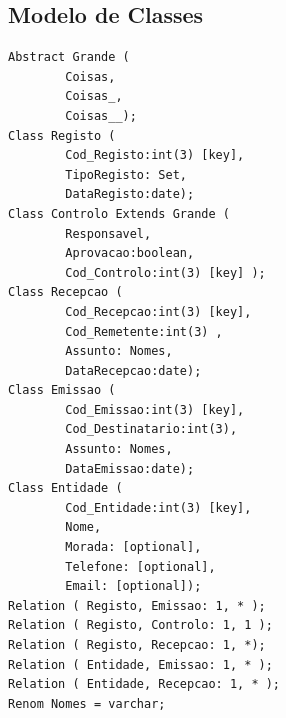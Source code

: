 \documentclass[a4paper]{article}
\begin{document}
\begin{appendix}
\section{Modelo de Classes}
\begin{small}
\begin{lstlisting}
Abstract Grande (
        Coisas,
        Coisas_,
        Coisas__);
Class Registo (
        Cod_Registo:int(3) [key],
        TipoRegisto: Set,
        DataRegisto:date);
Class Controlo Extends Grande (
        Responsavel,
        Aprovacao:boolean,
        Cod_Controlo:int(3) [key] );
Class Recepcao (
        Cod_Recepcao:int(3) [key],
        Cod_Remetente:int(3) ,
        Assunto: Nomes,
        DataRecepcao:date);
Class Emissao (
        Cod_Emissao:int(3) [key],
        Cod_Destinatario:int(3),
        Assunto: Nomes,
        DataEmissao:date);
Class Entidade (
        Cod_Entidade:int(3) [key],
        Nome,
        Morada: [optional],
        Telefone: [optional],
        Email: [optional]);
Relation ( Registo, Emissao: 1, * );
Relation ( Registo, Controlo: 1, 1 );
Relation ( Registo, Recepcao: 1, *);
Relation ( Entidade, Emissao: 1, * );
Relation ( Entidade, Recepcao: 1, * );
Renom Nomes = varchar;
\end{lstlisting}
\end{small}

\newpage


\end{appendix}
\end{document}
